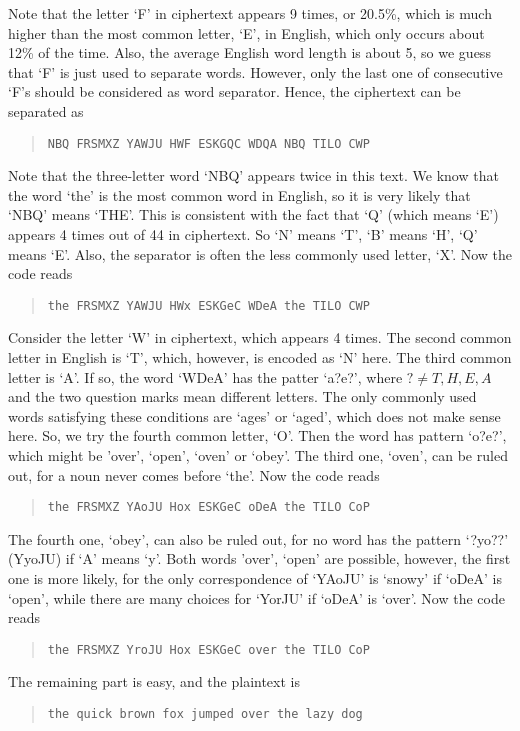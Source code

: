 \documentclass[a4paper,11pt]{article}
\begin{document}
    Note that the letter `F' in ciphertext appears 9 times, or 20.5\%, which is much higher than the most common letter, `E', in English, which only occurs about 12\% of the time. Also, the average English word length is about 5, so we guess that `F' is just used to separate words. However, only the last one of consecutive `F's should be considered as word separator. Hence, the ciphertext can be separated as
    \begin{quote}
      \texttt{NBQ FRSMXZ YAWJU HWF ESKGQC WDQA NBQ TILO CWP}
    \end{quote}
    Note that the three-letter word `NBQ' appears twice in this text. We know that the word `the' is the most common word in English, so it is very likely that `NBQ' means `THE'. This is consistent with the fact that `Q' (which means `E') appears 4 times out of 44 in ciphertext. So `N' means `T', `B' means `H', `Q' means `E'. Also, the separator is often the less commonly used letter, `X'. Now the code reads
    \begin{quote}
      \texttt{the FRSMXZ YAWJU HWx ESKGeC WDeA the TILO CWP}
    \end{quote}
    Consider the letter `W' in ciphertext, which appears 4 times. The second common letter in English is `T', which, however, is encoded as `N' here. The third common letter is `A'. If so, the word `WDeA' has the patter `a?e?', where $? \neq T, H, E, A$ and the two question marks mean different letters. The only commonly used words satisfying these conditions are `ages' or `aged', which does not make sense here. So, we try the fourth common letter, `O'. Then the word has pattern `o?e?', which might be 'over', `open', `oven' or `obey'. The third one, `oven', can be ruled out, for a noun never comes before `the'. Now the code reads
    \begin{quote}
      \texttt{the FRSMXZ YAoJU Hox ESKGeC oDeA the TILO CoP}
    \end{quote}
    The fourth one, `obey', can also be ruled out, for no word has the pattern `?yo??' (YyoJU) if `A' means `y'. Both words 'over', `open' are possible, however, the first one is more likely, for the only correspondence of `YAoJU' is `snowy' if `oDeA' is `open', while there are many choices for `YorJU' if `oDeA' is `over'. Now the code reads
    \begin{quote}
      \texttt{the FRSMXZ YroJU Hox ESKGeC over the TILO CoP}
    \end{quote}
    The remaining part is easy, and the plaintext is
    \begin{quote}
      \texttt{the quick brown fox jumped over the lazy dog}
    \end{quote}
\end{document}
